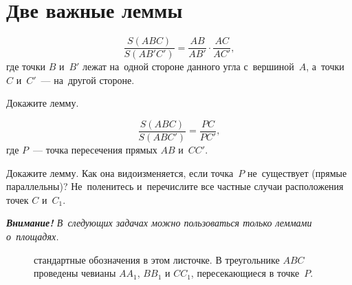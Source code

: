 
\section*{Две важные леммы}




\[
    \frac{S(A B C)}{S(A B' C')}
=
    \frac{A B}{A B'} \cdot \frac{A C}{A C'}
,\]
где точки $B$ и~$B'$ лежат на~одной стороне данного угла с~вершиной~$A$,
а~точки $C$ и~$C'$~--- на~другой стороне.

\begin{problems}

\item
Докажите лемму.

\end{problems}

\[
    \frac{S(A B C)}{S(A B C')} = \frac{P C}{P C'}
,\]
где $P$~--- точка пересечения прямых $AB$ и~$CC'$.

\begin{problems}

\item
Докажите лемму.
Как она видоизменяется, если точка~$P$ не~существует (прямые параллельны)?
Не~поленитесь и~перечислите все частные случаи расположения точек $C$ и~$C_1$.

\end{problems}

\emph{%
\textbf{Внимание!}
В~следующих задачах можно пользоваться \emph{только} леммами о~площадях.}

\begin{figure}[hb]
\begin{center}
    \caption{%
        стандартные обозначения в этом листочке.
        В треугольнике $ABC$ проведены чевианы $A A_1$, $B B_1$ и $C C_1$,
        пересекающиеся в точке~$P$.}
    \label{triangle-area-1:fig:generic-triangle}
\end{center}
\end{figure}

